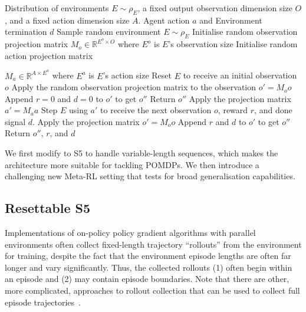 \documentclass{article}
\begin{document}
\begin{algorithm}[t]
   \caption{Pseudocode for the Multi-Environment Meta-Learning environment step. 
}
   \label{alg:wrapper-code}
\begin{algorithmic}[1]
   \REQUIRE Distribution of environments $E \sim \rho_E$, a fixed output observation dimension size $O$, and a fixed action dimension size $A$. Agent action $a$ and Environment termination $d$
   \STATE Sample random environment $E \sim \rho_E$
   \STATE Initialise random observation projection matrix $M_o \in \mathbb{R}^{E^o \times O}$ where $E^o$ is $E$'s observation size
   \STATE Initialise random action projection matrix 
   
   $M_a \in \mathbb{R}^{A \times E^a}$ where $E^a$ is $E$'s action size
   \STATE Reset $E$ to receive an initial observation $o$
   \STATE Apply the random observation projection matrix to the observation $o'=M_oo$
   \STATE Append $r=0$ and $d=0$ to $o'$ to get $o''$
   \STATE Return $o''$
   \ELSE
   \STATE Apply the projection matrix $a' = M_aa$
   \STATE Step $E$ using $a'$ to receive the next observation $o$, reward $r$, and done signal $d$. %
   \STATE Apply the projection matrix $o'=M_oo$
   \STATE Append $r$ and $d$ to $o'$ to get $o''$
   \STATE Return $o''$, $r$, and $d$
   \ENDIF
   \ENDFUNCTION
\end{algorithmic}
\end{algorithm}


We first modify to S5 to handle variable-length sequences, which makes the architecture more suitable for tackling POMDPs. We then introduce a challenging new  Meta-RL setting that tests for broad generalisation capabilities.

\subsection{Resettable S5}

Implementations of on-policy policy gradient algorithms with parallel environments often collect fixed-length trajectory ``rollouts'' from the environment for training, despite the fact that the environment episode lengths are often far longer and vary significantly. Thus, the collected rollouts (1) often begin within an episode and (2) may contain episode boundaries. Note that there are other, more complicated, approaches to rollout collection that can be used to collect full episode trajectories~\cite{liang2018rllib}.
\end{document}
